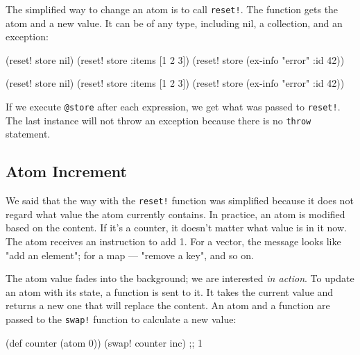 
The simplified way to change an atom is to call \verb|reset!|. The function gets the atom and a new value. It can be of any type, including nil, a collection, and an exception:

\ifx\DEVICETYPE\MOBILE

\begin{english}
  \begin{clojure}
(reset! store nil)
(reset! store {:items [1 2 3]})
(reset! store (ex-info "error"
                {:id 42}))
  \end{clojure}
\end{english}

\else

\begin{english}
  \begin{clojure}
(reset! store nil)
(reset! store {:items [1 2 3]})
(reset! store (ex-info "error" {:id 42}))
  \end{clojure}
\end{english}
\fi

If we execute \verb|@store| after each expression, we get what was passed to \verb|reset!|.
The last instance will not throw an exception because there is no \verb|throw| statement.

\subsection{Atom Increment}


We said that the way with the \verb|reset!| function was simplified because it does not regard what value the atom currently contains. In practice, an atom is modified based on the content.
If it's a counter, it doesn't matter what value is in it now. The atom receives an instruction to add 1.
For a vector, the message looks like "add an element"; for a map — "remove a key", and so on.

The atom value fades into the background; we are interested \emph{in action}.
To update an atom with its state, a function is sent to it. It takes the current value and returns a new one that will replace the content.
An atom and a function are passed to the \verb|swap!| function to calculate a new value:


\begin{english}
  \begin{clojure}
(def counter (atom 0))
(swap! counter inc) ;; 1
  \end{clojure}
\end{english}

